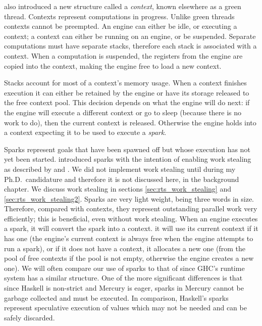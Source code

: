\citet{conway:2002:par} also introduced a new structure called a
\emph{context}, known elsewhere as a green thread.
Contexts represent computations in progress.
Unlike green threads contexts cannot be preempted.
An engine can either be idle, or executing a context;
a context can either be running on an engine, or be suspended.
Separate computations must have separate stacks,
therefore each stack is associated with a context.
When a computation is suspended,
the registers from the engine are copied into the context,
making the engine free to load a new context.

Stacks account for most of a context's memory usage.
When a context finishes execution
it can either be retained by the engine or
have its storage released to the free context pool.
This decision depends on what the engine will do next:
if the engine will execute a different context or go to sleep
(because there is no work to do),
then the current context is released.
Otherwise the engine holds into a context expecting it to be used to execute
a \emph{spark}.

Sparks represent goals that have been spawned off
but whose execution has not yet been started.
\citet{wang:2006:hons} introduced sparks with the intention of
enabling work stealing as described by
\citet{blumofe:1994:work-stealing,halstead:1985:multilisp}
and \citet{kranz:1989:mul-t_article}.
We did not implement work stealing until during my Ph.D.\ candidature
and therefore it is not discussed here, in the background chapter.
We discuss work stealing in sections \ref{sec:rts_work_stealing}
and \ref{sec:rts_work_stealing2}.
Sparks are very light weight,
being three words in size.
Therefore, compared with contexts,
they represent outstanding parallel work very efficiently;
this is beneficial, even without work stealing.
When an engine executes a spark, it will convert the spark into a context.
it will use its current context if it has one
(the engine's current context is always free when the engine attempts to run
a spark),
or if it does not have a context,
it allocates a new one
(from the pool of free contexts if the pool is not empty,
otherwise the engine creates a new one).
We will often compare our use of sparks to that of
\citet{simonmar_2009_multicore_rts} since GHC's runtime system has a
similar structure.
One of the more significant differences
is that since Haskell is non-strict and Mercury is eager,
sparks in Mercury cannot be garbage collected and must be executed.
In comparison,
Haskell's sparks represent speculative execution of values which may not be
needed and can be safely discarded.

